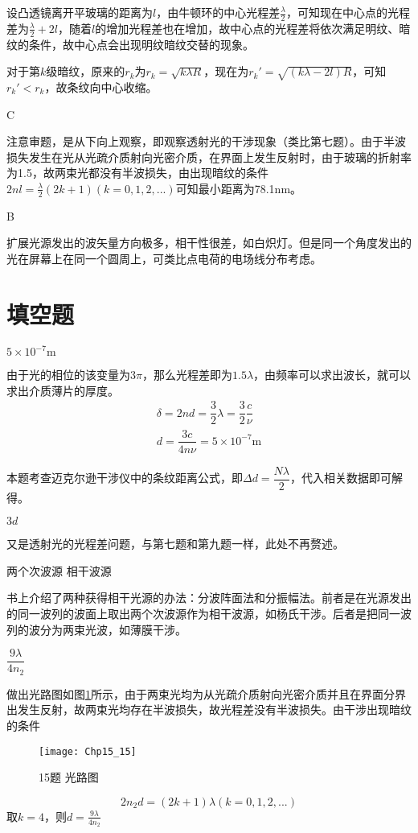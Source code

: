 设凸透镜离开平玻璃的距离为$l$，由牛顿环的中心光程差$\frac{\lambda}{2}$，可知现在中心点的光程差为$\frac{\lambda}{2}+2l$，随着$l$的增加光程差也在增加，故中心点的光程差将依次满足明纹、暗纹的条件，故中心点会出现明纹暗纹交替的现象。

对于第$k$级暗纹，原来的$r_k$为$r_k=\sqrt{k\lambda R}$，现在为$r_k'=\sqrt{(k\lambda-2l)R}$，可知$r_k'<r_k$，故条纹向中心收缩。

\exercise C

\solve 注意审题，是从下向上观察，即观察透射光的干涉现象（类比第七题）。由于半波损失发生在光从光疏介质射向光密介质，在界面上发生反射时，由于玻璃的折射率为1.5，故两束光都没有半波损失，由出现暗纹的条件$2nl=\frac{\lambda}{2}(2k+1)(k=0,1,2,...)$可知最小距离为78.1nm。

\exercise B

\solve 扩展光源发出的波矢量方向极多，相干性很差，如白炽灯。但是同一个角度发出的光在屏幕上在同一个圆周上，可类比点电荷的电场线分布考虑。
\section{填空题}
\exercise $5\times10^{-7}\mathrm{m}$ 

\solve 由于光的相位的该变量为$3\pi$，那么光程差即为$1.5\lambda$，由频率可以求出波长，就可以求出介质薄片的厚度。
\begin{gather*}
	\delta=2nd=\dfrac{3}{2}\lambda=\dfrac{3}{2}\dfrac{c}{\nu}\\
	d=\dfrac{3c}{4n\nu}=5\times 10^{-7}\mathrm{m}
\end{gather*}


\solve 本题考查迈克尔逊干涉仪中的条纹距离公式，即$\Delta d=\dfrac{Nλ}{2}$，代入相关数据即可解得。

\exercise $3d$

\solve  又是透射光的光程差问题，与第七题和第九题一样，此处不再赘述。

\exercise 两个次波源 \quad 相干波源 

\solve 书上介绍了两种获得相干光源的办法：分波阵面法和分振幅法。前者是在光源发出的同一波列的波面上取出两个次波源作为相干波源，如杨氏干涉。后者是把同一波列的波分为两束光波，如薄膜干涉。

\exercise $\dfrac{9\lambda}{4n_2}$

\solve 做出光路图如图\ref{fig:15_15}所示，由于两束光均为从光疏介质射向光密介质并且在界面分界出发生反射，故两束光均存在半波损失，故光程差没有半波损失。由干涉出现暗纹的条件
\begin{figure}[!h]
	\centering
	\texttt{[image: Chp15\_15]}
	\caption{15题 光路图}\label{fig:15_15}
\end{figure}
\[
2n_2d=(2k+1)\lambda(k=0,1,2,...)
\]
取$k=4$，则$d=\frac{9\lambda}{4n_2}$

